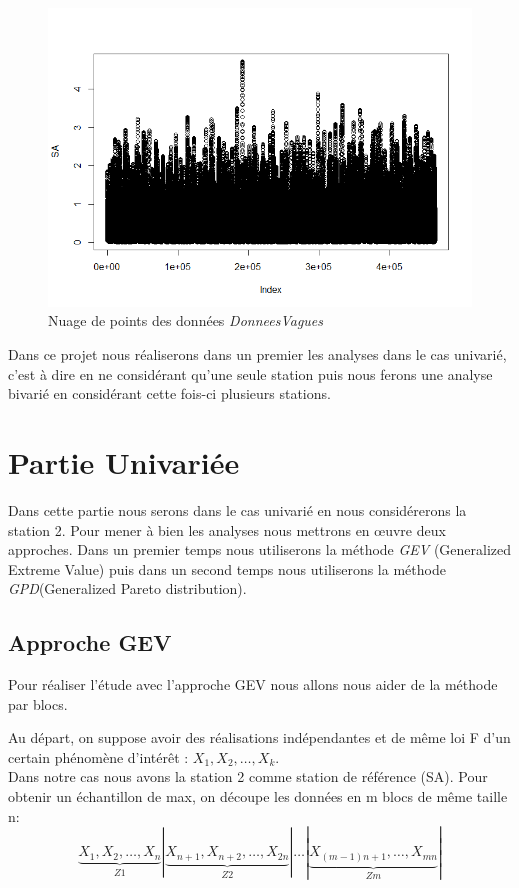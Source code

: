 \documentclass[a4paper,french,10pt]{article}
\begin{document}
\begin{figure}[htp] 
	\centering
	\includegraphics[scale=0.45]{images/graph_data.png}
	\caption{Nuage de points des données \textit{DonneesVagues}}
	\label{data}
\end{figure}

\newpage

Dans ce projet nous réaliserons dans un premier les analyses dans le cas univarié, c'est à dire en ne considérant qu'une seule station puis nous ferons une analyse bivarié en considérant cette fois-ci plusieurs stations.

\section{Partie Univariée}
Dans cette partie nous serons dans le cas univarié en nous considérerons la station 2.
Pour mener à bien les analyses nous mettrons en œuvre deux approches. Dans un premier temps nous utiliserons la méthode \textit{GEV} (Generalized Extreme Value) puis dans un second temps nous utiliserons la méthode \textit{GPD}(Generalized Pareto
distribution).
\subsection{Approche GEV}
Pour réaliser l'étude avec l'approche GEV nous allons nous aider de la méthode par blocs.

Au départ, on suppose avoir des réalisations indépendantes et de même loi F d’un certain
phénomène d’intérêt : $X_1, X_2,\dots, X_k$. \\
Dans notre cas nous avons la station 2 comme station de référence (SA).
Pour obtenir un échantillon de max, on découpe les données en m blocs de
même taille n:
\[
	\underbrace{X_1, X_2,\dots, X_n}_{Z1}| \underbrace{X_{n+1}, X_{n+2},\dots, X_{2n}}_{Z2}| \dots |\underbrace {X_{(m-1)n+1}, \dots, X_{mn}}_{Zm}|
\]
\end{document}
